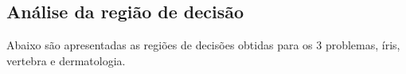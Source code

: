 \documentclass[ 
	article,			%
	11pt,				%
	oneside,			%
	a4paper,			%
	english,			%
	brazil,				%
	]{abntex2}
\begin{document}
% 
% 
% 
% 
% 
% 
% 
% 
% 
% 
% 
% 
% 


\subsection{Análise da região de decisão}
Abaixo são apresentadas as regiões de decisões obtidas para os 3 problemas,
íris, vertebra e dermatologia. 
\end{document}
